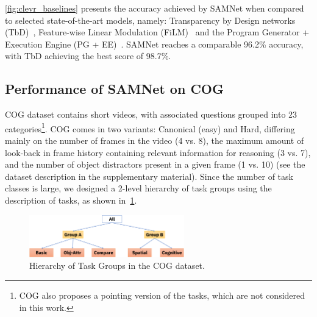 \cref{fig:clevr_baselines} presents the accuracy achieved by SAMNet when compared to selected state-of-the-art models, namely: Transparency by Design networks (TbD)~\cite{mascharka2018transparency}, Feature-wise Linear Modulation (FiLM)~\cite{perez2018film} and the Program Generator + Execution Engine (PG + EE)~\cite{johnson2017inferring}.
SAMNet reaches a comparable 96.2\% accuracy, with TbD achieving the best score of 98.7\%.


\subsection{Performance of SAMNet on COG}
\label{sec:cog-baseline-compare}

COG dataset contains short videos, with associated questions grouped into 23 categories\footnote{COG also proposes a pointing version of the tasks, which are not considered in this work.}.
COG comes in two variants: Canonical (easy) and Hard, differing mainly on the number of frames in the video (4 vs. 8), the maximum amount of look-back in frame history containing relevant information for reasoning (3 vs. 7), and the number of object distractors present in a given frame (1 vs. 10) (see the dataset description in the supplementary material).
Since the number of task classes is large, we designed a 2-level hierarchy of task groups using the
description of tasks, as shown in~\cref{fig:task-groups}.



\begin{figure}[b!]
	\centering
	\includegraphics[width=0.6\textwidth]{../img/architecture/hierarchy}
	\caption{Hierarchy of Task Groups in the COG dataset.}
	\label{fig:task-groups}
\end{figure}



